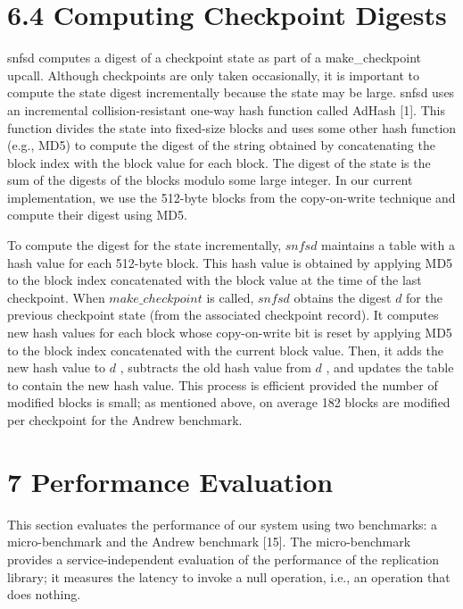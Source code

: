 \documentclass[
]{article}
\begin{document}
\section{6.4 Computing Checkpoint
Digests}\label{computing-checkpoint-digests}

snfsd computes a digest of a checkpoint state as part of a
make\_checkpoint upcall. Although checkpoints are only taken
occasionally, it is important to compute the state digest incrementally
because the state may be large. snfsd uses an incremental
collision-resistant one-way hash function called AdHash {[}1{]}. This
function divides the state into fixed-size blocks and uses some other
hash function (e.g., MD5) to compute the digest of the string obtained
by concatenating the block index with the block value for each block.
The digest of the state is the sum of the digests of the blocks modulo
some large integer. In our current implementation, we use the 512-byte
blocks from the copy-on-write technique and compute their digest using
MD5.

To compute the digest for the state incrementally, \(snfsd\) maintains a
table with a hash value for each 512-byte block. This hash value is
obtained by applying MD5 to the block index concatenated with the block
value at the time of the last checkpoint. When \(make\_checkpoint\) is
called, \(snfsd\) obtains the digest \(d\) for the previous checkpoint
state (from the associated checkpoint record). It computes new hash
values for each block whose copy-on-write bit is reset by applying MD5
to the block index concatenated with the current block value. Then, it
adds the new hash value to \(d\) , subtracts the old hash value from
\(d\) , and updates the table to contain the new hash value. This
process is efficient provided the number of modified blocks is small; as
mentioned above, on average 182 blocks are modified per checkpoint for
the Andrew benchmark.

\section{7 Performance Evaluation}\label{performance-evaluation}

This section evaluates the performance of our system using two
benchmarks: a micro-benchmark and the Andrew benchmark {[}15{]}. The
micro-benchmark provides a service-independent evaluation of the
performance of the replication library; it measures the latency to
invoke a null operation, i.e., an operation that does nothing.
\end{document}
